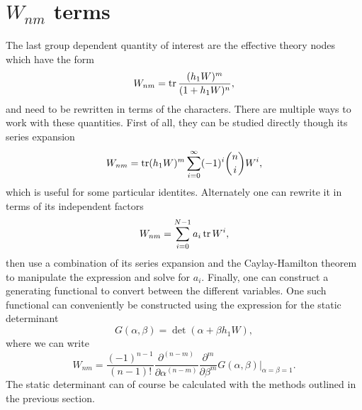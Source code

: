 \section{\texorpdfstring{$W_{nm}$}{Wnm} terms}
\label{sec:evaluating-polyakov-coupling-terms}

The last group dependent quantity of interest are the effective theory nodes
which have the form
%
\begin{equation}
  W_{nm} = \operatorname{tr} \frac{(h_1 W)^m}{(1 + h_1 W)^n},
\end{equation}
%
and need to be rewritten in terms of the characters. There are multiple ways to
work with these quantities. First of all, they can be studied
directly though its series expansion
%
\begin{equation}
  W_{nm} = \operatorname{tr} (h_1 W)^m \sum_{i=0}^{\infty} (-1)^i \binom{n}{i} W^i,
\end{equation}
%
which is useful for some particular identites. Alternately one can rewrite it in
terms of its independent factors
%
\begin{equation}
  W_{nm} = \sum_{i=0}^{N-1} a_i \operatorname{tr}{W^i},
\end{equation}
%
then use a combination of its series expansion and the Caylay-Hamilton theorem
to manipulate the expression and solve for $a_i$. Finally, one can construct a
generating functional to convert between the different variables. One such
functional can conveniently be constructed using the expression for the static
determinant
%
\begin{equation}
  G(\alpha,\beta) = \det ( \alpha + \beta h_1 W ),
\end{equation}
%
where we can write
%
\begin{equation}
  W_{nm} = \frac{(-1)^{n-1}}{(n-1)!} \frac{\partial^{(n-m)}}{\partial \alpha^{(n-m)}}
    \frac{\partial^{m}}{\partial \beta^m} G(\alpha,\beta)
    \bigg|_{\alpha=\beta=1}.
\end{equation}
%
The static determinant can of course be calculated with the methods outlined in
the previous section.
